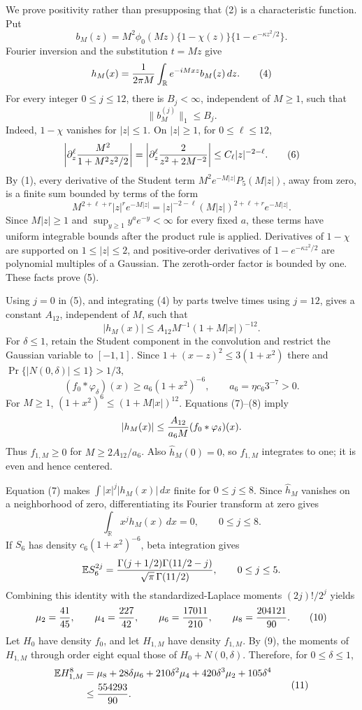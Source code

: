 We prove positivity rather than presupposing that (2) is a characteristic function.  Put
\[
 b_M(z)=M^2\phi_0(Mz)\{1-\chi(z)\}
             \{1-e^{-\kappa z^2/2}\}.
\]
Fourier inversion and the substitution \(t=Mz\) give
\[
 h_M(x)={1\over2\pi M}
 \int_{\mathbb R}e^{-iMxz}b_M(z)\,dz. \tag{4}
\]
For every integer \(0\le j\le12\), there is \(B_j<\infty\), independent of \(M\ge1\), such that
\[
 \|b_M^{(j)}\|_1\le B_j. \tag{5}
\]
Indeed, \(1-\chi\) vanishes for \(|z|\le1\).  On \(|z|\ge1\), for \(0\le\ell\le12\),
\[
 \left|\partial_z^\ell{M^2\over1+M^2z^2/2}\right|
 =\left|\partial_z^\ell{2\over z^2+2M^{-2}}\right|
 \le C_\ell |z|^{-2-\ell}. \tag{6}
\]
By (1), every derivative of the Student term \(M^2e^{-M|z|}P_5(M|z|)\), away from zero, is a finite sum bounded by terms of the form
\[
 M^{2+\ell+r}|z|^re^{-M|z|}
 =|z|^{-2-\ell}(M|z|)^{2+\ell+r}e^{-M|z|}.
\]
Since \(M|z|\ge1\) and \(\sup_{y\ge1}y^ae^{-y}<\infty\) for every fixed \(a\), these terms have uniform integrable bounds after the product rule is applied.  Derivatives of \(1-\chi\) are supported on \(1\le|z|\le2\), and positive-order derivatives of \(1-e^{-\kappa z^2/2}\) are polynomial multiples of a Gaussian.  The zeroth-order factor is bounded by one.  These facts prove (5).

Using \(j=0\) in (5), and integrating (4) by parts twelve times using \(j=12\), gives a constant \(A_{12}\), independent of \(M\), such that
\[
 |h_M(x)|\le A_{12}M^{-1}(1+M|x|)^{-12}. \tag{7}
\]
For \(\delta\le1\), retain the Student component in the convolution and restrict the Gaussian variable to \([-1,1]\).  Since \(1+(x-z)^2\le3(1+x^2)\) there and \(\Pr\{|N(0,\delta)|\le1\}>1/3\),
\[
 (f_0*\varphi_\delta)(x)
 \ge a_6(1+x^2)^{-6},
 \qquad a_6=\eta c_6 3^{-7}>0. \tag{8}
\]
For \(M\ge1\), \((1+x^2)^6\le(1+M|x|)^{12}\).  Equations (7)--(8) imply
\[
 |h_M(x)|\le {A_{12}\over a_6M}(f_0*\varphi_\delta)(x).
\]
Thus \(f_{1,M}\ge0\) for \(M\ge2A_{12}/a_6\).  Also \(\widehat h_M(0)=0\), so \(f_{1,M}\) integrates to one; it is even and hence centered.

Equation (7) makes \(\int |x|^j|h_M(x)|\,dx\) finite for \(0\le j\le8\).  Since \(\widehat h_M\) vanishes on a neighborhood of zero, differentiating its Fourier transform at zero gives
\[
 \int_{\mathbb R}x^jh_M(x)\,dx=0,
 \qquad 0\le j\le8. \tag{9}
\]
If \(S_6\) has density \(c_6(1+x^2)^{-6}\), beta integration gives
\[
 \mathbb ES_6^{2j}
 ={\Gamma(j+1/2)\Gamma(11/2-j)\over
   \sqrt\pi\,\Gamma(11/2)},
 \qquad0\le j\le5.
\]
Combining this identity with the standardized-Laplace moments \((2j)!/2^j\) yields
\[
 \mu_2={41\over45},\qquad
 \mu_4={227\over42},\qquad
 \mu_6={17011\over210},\qquad
 \mu_8={204121\over90}. \tag{10}
\]
Let \(H_0\) have density \(f_0\), and let \(H_{1,M}\) have density \(f_{1,M}\).  By (9), the moments of \(H_{1,M}\) through order eight equal those of \(H_0+N(0,\delta)\).  Therefore, for \(0\le\delta\le1\),
\[
 \begin{aligned}
 \mathbb EH_{1,M}^8
 &=\mu_8+28\delta\mu_6+210\delta^2\mu_4
   +420\delta^3\mu_2+105\delta^4\\
 &\le {554293\over90}. 
 \end{aligned} \tag{11}
\]

